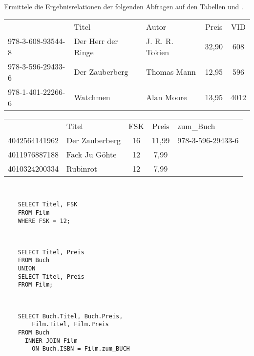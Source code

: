 \documentclass[10pt, a4paper, ngerman]{arbeitsblatt}
\begin{document}
\newpage
\begin{aufgabe}
Ermittele die Ergebnisrelationen der folgenden Abfragen auf den Tabellen  und .

\begin{tabularx}{\textwidth}{XXXcc} \hline
	\rowcolor{ab.tabelle.kopf.hg!90!black}
	\multicolumn{5}{l}{\code{Buch}} \\ \hline
	\rowcolor{ab.tabelle.kopf.hg}
	\primarykey{ISBN} & Titel & Autor & Preis & VID\\ \hline\toprule
	978-3-608-93544-8 & Der Herr der Ringe & J. R. R. Tokien & 32,90 & 608 \\\midrule
	978-3-596-29433-6 & Der Zauberberg & Thomas Mann & 12,95 & 596 \\\midrule
	978-1-401-22266-6 & Watchmen & Alan Moore & 13,95 & 4012 \\\bottomrule
\end{tabularx}

\begin{tabularx}{\textwidth}{XXccX} \hline
	\rowcolor{ab.tabelle.kopf.hg!90!black}
	\multicolumn{5}{l}{\code{Film}} \\ \hline
	\rowcolor{ab.tabelle.kopf.hg}
	\primarykey{EAN} & Titel & FSK & Preis & zum\_Buch\\ \hline\toprule
	4042564141962 & Der Zauberberg & 16 & 11,99 & 978-3-596-29433-6 \\\midrule
	4011976887188 & Fack Ju Göhte & 12 & 7,99 & \\\midrule
	4010324200334 & Rubinrot & 12 & 7,99 & \\\bottomrule
\end{tabularx}

\begin{multicols}{2}
\begin{enuma}
	\item ~\\[-3em]\begin{verbatim}
	SELECT Titel, FSK
	FROM Film
	WHERE FSK = 12;
	\end{verbatim}

	\item ~\\[-3em]\begin{verbatim}
	SELECT Titel, Preis
	FROM Buch
	UNION
	SELECT Titel, Preis
	FROM Film;
	\end{verbatim}

	\columnbreak
	\item ~\\[-3em]\begin{verbatim}
	SELECT Buch.Titel, Buch.Preis,
		Film.Titel, Film.Preis
	FROM Buch
	  INNER JOIN Film
		ON Buch.ISBN = Film.zum_BUCH
	\end{verbatim}


\end{enuma}
\end{multicols}
\end{aufgabe}
\end{document}
